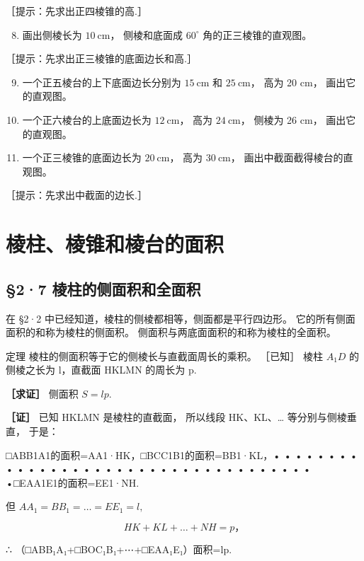 ［提示：先求出正四棱锥的高.］

\begin{enumerate}
\setcounter{enumi}{7}
\item
  画出侧棱长为 \(10 \mathrm{~cm}\)， 侧棱和底面成 \(60^{\circ}\)
  角的正三棱锥的直观图。
\end{enumerate}

［提示：先求出正三棱锥的底面边长和高.］

\begin{enumerate}
\setcounter{enumi}{8}
\item
  一个正五棱台的上下底面边长分别为 \(15 \mathrm{~cm}\) 和
  \(25 \mathrm{~cm}\)， 高为 20 cm， 画出它的直观图。
\item
  一个正六棱台的上底面边长为 \(12 \mathrm{~cm}\)， 高为
  \(24 \mathrm{~cm}\)， 侧棱为 26 cm， 画出它的直观图。
\item
  一个正三棱锥的底面边长为 \(20 \mathrm{~cm}\)， 高为
  \(30 \mathrm{~cm}\)， 画出中截面截得棱台的直观图。
\end{enumerate}

［提示：先求出中截面的边长.］

\section{棱柱、棱锥和棱台的面积}

\subsection{§2·7
棱柱的侧面积和全面积}

在 §2·2 中已经知道，棱柱的侧棱都相等，侧面都是平行四边形。
它的所有侧面面积的和称为棱柱的侧面积。
侧面积与两底面面积的和称为棱柱的全面积。

定理 棱柱的侧面积等于它的侧棱长与直截面周长的乘积。 ［已知］ 棱柱
\(A_{1}D\) 的侧棱之长为 l，直截面 HKLMN 的周长为 p.

\textbf{［求证］} 侧面积 \(S = lp\).

\textbf{［证］} 已知 HKLMN 是棱柱的直截面， 所以线段 HK、KL、\ldots{}
等分别与侧棱垂直， 于是：

□ABB1A1的面积=AA1·HK，□BCC1B1的面积=BB1·KL，• • • • • • • • • • • • • •
• • • • • • • • • • • • • • • • • • • • • • •□EAA1E1的面积=EE1·NH.

但 \(AA_{1} = BB_{1} = \dots = EE_{1} = l,\)

\[
H K + K L + \dots + N H = p\text{，}
\]

∴ （□ABB₁A₁+□BOC₁B₁+⋯+□EAA₁E₁）面积=lp.

